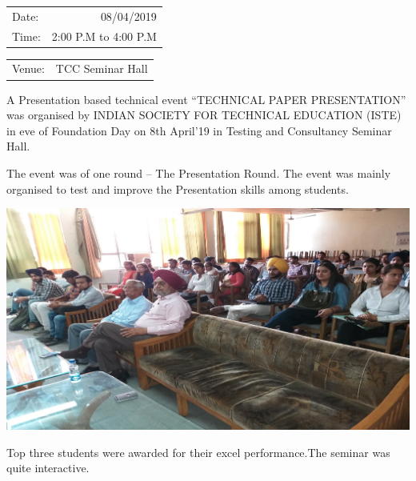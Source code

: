 \documentclass[12pt, a4 paper]{article}
\begin{document}
\begin{center}
\begin{multicols}{2}
\begin{tabular}{l r}
Date: & 08/04/2019\\ %
Time: & 2:00 P.M to 4:00 P.M \\ %
\end{tabular}
\columnbreak
\begin{tabular}{l r}
Venue: & TCC Seminar Hall \\ %

\end{tabular}
\end{multicols}

\medskip
\justify
\begin{large}

 A Presentation based technical event “TECHNICAL PAPER PRESENTATION” was organised by INDIAN SOCIETY FOR TECHNICAL EDUCATION (ISTE) in eve of Foundation Day on 8th April’19 in Testing and Consultancy Seminar Hall.

\bigskip

\begin{multicols}{2}

The event was of one round – The Presentation Round.
The event was mainly organised to test and improve the Presentation skills among students. 
\columnbreak

\includegraphics[width=\linewidth]{image6.jpeg}
  
\end{multicols} 

Top three students were awarded for their excel performance.The seminar was quite interactive.
\newpage 


\end{large}
\end{center}
\end{document}
